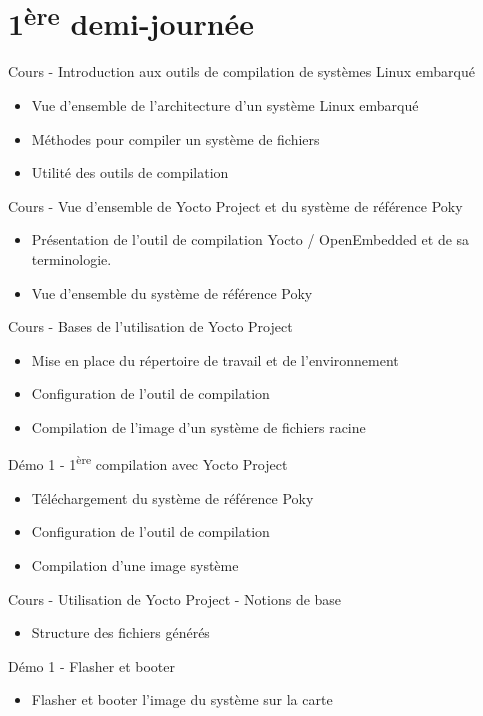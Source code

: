 \documentclass[a4paper,12pt,obeyspaces,spaces,hyphens]{article}
\begin{document}
\section{1\textsuperscript{ère} demi-journée}

\feagendaonecolumn
{Cours - Introduction aux outils de compilation de systèmes Linux embarqué}
{
  \begin{itemize}
  \item Vue d'ensemble de l'architecture d'un système Linux embarqué
  \item Méthodes pour compiler un système de fichiers
  \item Utilité des outils de compilation
  \end{itemize}
}

\feagendaonecolumn
{Cours - Vue d'ensemble de Yocto Project et du système de référence Poky}
{
  \begin{itemize}
  \item Présentation de l'outil de compilation Yocto / OpenEmbedded et de sa terminologie.
  \item Vue d'ensemble du système de référence Poky
  \end{itemize}
}

\feagendatwocolumn
{Cours - Bases de l'utilisation de Yocto Project}
{
  \begin{itemize}
  \item Mise en place du répertoire de travail et de l'environnement
  \item Configuration de l'outil de compilation
  \item Compilation de l'image d'un système de fichiers racine
  \end{itemize}
}
{Démo 1 - 1\textsuperscript{ère} compilation avec Yocto Project}
{
  \begin{itemize}
  \item Téléchargement du système de référence Poky
  \item Configuration de l'outil de compilation
  \item Compilation d'une image système
 \end{itemize}
}

\feagendatwocolumn
{Cours - Utilisation de Yocto Project - Notions de base}
{
  \begin{itemize}
  \item Structure des fichiers générés
  \end{itemize}
}
{Démo 1 - Flasher et booter}
{
  \begin{itemize}
  \item Flasher et booter l'image du système sur la carte
  \end{itemize}
}
\end{document}
